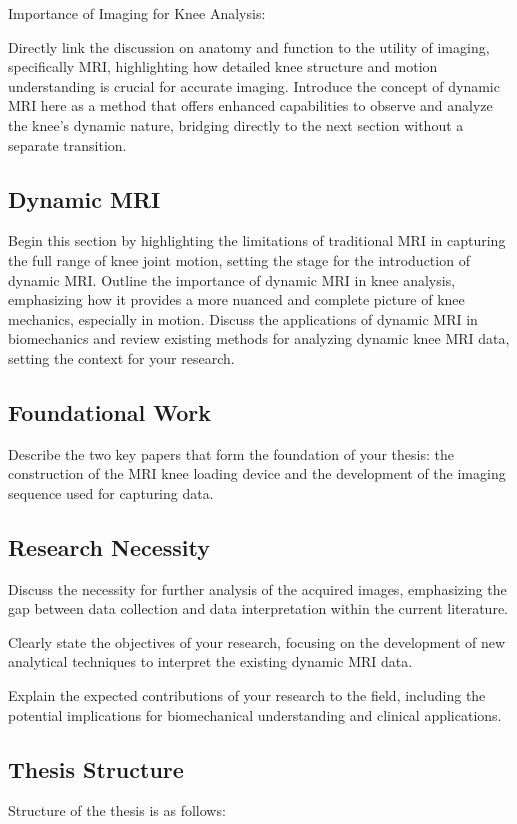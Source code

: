 \documentclass{micro-econ-thesis}
\begin{document}
Importance of Imaging for Knee Analysis:

Directly link the discussion on anatomy and function to the utility of imaging, specifically MRI, highlighting how detailed knee structure and motion understanding is crucial for accurate imaging.
Introduce the concept of dynamic MRI here as a method that offers enhanced capabilities to observe and analyze the knee's dynamic nature, bridging directly to the next section without a separate transition.
\subsection{Dynamic MRI}
Begin this section by highlighting the limitations of traditional MRI in capturing the full range of knee joint motion, setting the stage for the introduction of dynamic MRI.
Outline the importance of dynamic MRI in knee analysis, emphasizing how it provides a more nuanced and complete picture of knee mechanics, especially in motion.
Discuss the applications of dynamic MRI in biomechanics and review existing methods for analyzing dynamic knee MRI data, setting the context for your research.

\subsection{Foundational Work}
Describe the two key papers that form the foundation of your thesis: the construction of the MRI knee loading device \parencite{brisson_novel_2022} and the development of the imaging sequence used for capturing data. \parencite{aleksiev_high-resolution_2022}

\subsection{Research Necessity}
Discuss the necessity for further analysis of the acquired images, emphasizing the gap between data collection and data interpretation within the current literature.

Clearly state the objectives of your research, focusing on the development of new analytical techniques to interpret the existing dynamic MRI data.

Explain the expected contributions of your research to the field, including the potential implications for biomechanical understanding and clinical applications.

\subsection{Thesis Structure}
Structure of the thesis is as follows: 
\end{document}
